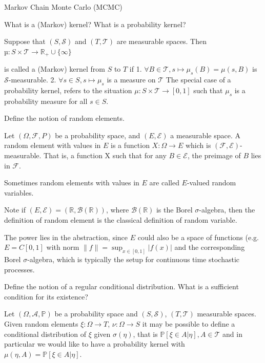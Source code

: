 Markov Chain Monte Carlo (MCMC)

What is a (Markov) kernel? What is a probability kernel?

Suppose that \( (S, \mathcal{S}) \) and \( (T , \mathcal{T}) \) are measurable spaces. Then
\( µ : S \times \mathcal{T} \to \mathbb{R}_+ \cup \{\infty\}\)

is called a (Markov) kernel from \( S \) to \( T \) if
1. \( \forall B \in \mathcal{T}, s \mapsto \mu_s(B) = \mu(s, B) \) is \( \mathcal{S} \)-measurable.
2. \( \forall s \in S, s \mapsto \mu_s \) is a measure on \( \mathcal{T} \)
The special case of a probability kernel, refers to the situation \( \mu : S \times \mathcal{T} \to [0, 1] \) 
such that \( \mu_s \) is a probability measure for all \( s \in S \).


Define the notion of random elements.

Let \((\Omega, \mathcal{F}, P)\) be a probability space, and \( (E, \mathcal{E}) \) a measurable space. A random element with values in \( E \) is a function \( X : \Omega \to E \) which is 
\((\mathcal{F}, \mathcal{E})\)-measurable. That is, a function X such that for any \( B \in \mathcal{E} \), the preimage of \( B \) lies in \( \mathcal{F} \).

Sometimes random elements with values in \( E \) are called \( E \)-valued random variables.

Note if \( (E, \mathcal{E}) = (\mathbb{R} , \mathcal{B}(\mathbb{R}))\), where \( \mathcal{B}(\mathbb{R}) \) is the Borel \( \sigma \)-algebra, 
then the definition of random element is the classical definition of random variable.

The power lies in the abstraction, since \( E \) could also be a space of functions (e.g. \(E = C[0, 1] \) with norm \( \|f\| = \sup_{x \in [0, 1]} |f(x)| \) and the corresponding Borel \( \sigma \)-algebra, which is typically the setup for continuous time stochastic processes.

Define the notion of a regular conditional distribution. What is a sufficient
condition for its existence?

Let \( (\Omega, \mathcal{A}, \mathbb{P}) \) be a probability space and \( (S, \mathcal{S}) \), \( (T , \mathcal{T}) \) measurable spaces.
Given random elements \( \xi : \Omega \to T \), \( \nu : \Omega \to S\)
it may be possible to define a conditional distribution of \( \xi \) given \( \sigma(\eta) \), that is
\( \mathbb{P}[\xi \in A|\eta], A \in \mathcal{T} \) and in particular we would like to have a probability kernel
with \( \mu(\eta, A) = \mathbb{P}[\xi \in A|\eta] \).

